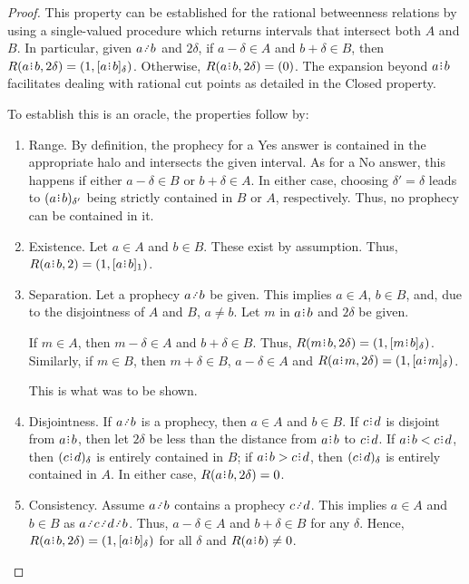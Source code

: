 \documentclass[12pt]{article}
\begin{document}
\begin{proof}
This property can be established for the rational betweenness relations by using a single-valued procedure which returns intervals that intersect both $A$ and $B$. In particular, given $a \lte b$ and $2\delta$, if $a-\delta \in A$ and $b+\delta \in B$, then $R(a\rint b, 2\delta) = (1, \clhalo[\delta]{a\rint b})$. Otherwise, $R(a \rint b, 2\delta) = (0)$.  The expansion beyond $a\rint b$ facilitates dealing with rational cut points as detailed in the Closed property. 

To establish this is an oracle, the properties follow by:  
\begin{enumerate}
    \item Range. By definition, the prophecy for a Yes answer is contained in the appropriate halo and intersects the given interval. As for a No answer, this happens if either $a - \delta \in B$ or $b+\delta \in A$. In either case, choosing $\delta' = \delta$ leads to $\halo[\delta']{a\rint b}$ being strictly contained in $B$ or $A$, respectively. Thus, no prophecy can be contained in it. 
    
    \item Existence. Let $a \in A$ and $b \in B$. These exist by assumption. Thus, $R(a\rint b, 2)= (1, \clhalo[1]{a\rint b})$.
    
    \item Separation. Let a prophecy $a \lte b$ be given. This implies $a \in A$, $b \in B$, and, due to the disjointness of $A$ and $B$, $a \neq b$. Let $m$ in $a\rint b$ and $2\delta$ be given. 

    If $m \in A$, then $m-\delta \in A$ and $b+\delta \in B$. Thus, $R(m\rint b, 2 \delta) = (1, \clhalo{m\rint b})$. Similarly, if $ m \in B$, then $m+\delta \in B$, $a-\delta \in A$ and $R(a\rint m, 2 \delta) = (1, \clhalo{a\rint m})$. 

    This is what was to be shown. 

    \item Disjointness. If $a\lte b$ is a prophecy, then $a \in A$ and $b \in B$. If $c\rint d$ is disjoint from $a\rint b$, then let $2\delta$ be less than the distance from $a\rint b$ to $c\rint d$. If $a\rint b < c\rint d$, then $\halo{c\rint d}$ is entirely contained in $B$; if $a\rint b > c\rint d$, then $\halo{c\rint d}$ is entirely contained in $A$. In either case, $R(a \rint b, 2 \delta) = 0$. 
    
    \item Consistency. Assume $a \lte b$ contains a prophecy $c \lte d$. This implies $a \in A$ and $b \in B$ as $a \lte c \lte d \lte b$. Thus, $a-\delta \in A$ and $b+\delta \in B$ for any $\delta$. Hence, $R(a\rint b, 2 \delta) = (1, \clhalo{a\rint b})$ for all $\delta$ and $R(a\rint b) \neq 0$. 
    

\end{enumerate}
\end{proof}
\end{document}
